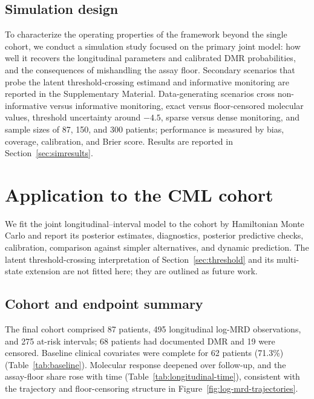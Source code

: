 \documentclass[11pt]{article}
\begin{document}
\subsection{Simulation design}
\label{sec:sim}

To characterize the operating properties of the framework beyond the
single cohort, we conduct a simulation study focused on the primary joint model: how well
it recovers the longitudinal parameters and calibrated DMR probabilities, and
the consequences of mishandling the assay floor. Secondary scenarios that
probe the latent threshold-crossing estimand and informative monitoring are
reported in the Supplementary Material. Data-generating
scenarios cross non-informative versus informative monitoring, exact
versus floor-censored molecular values, threshold uncertainty around
$-4.5$, sparse versus dense monitoring, and sample sizes of 87, 150, and
300 patients; performance is measured by bias, coverage, calibration, and
Brier score. Results are reported in Section~\ref{sec:simresults}.

\section{Application to the CML cohort}
\label{sec:application}

We fit the joint longitudinal--interval model to the cohort by Hamiltonian
Monte Carlo and report its posterior estimates, diagnostics, posterior
predictive checks, calibration, comparison against simpler alternatives, and
dynamic prediction. The latent threshold-crossing interpretation of
Section~\ref{sec:threshold} and its multi-state extension are not fitted
here; they are outlined as future work.

\subsection{Cohort and endpoint summary}

The final cohort comprised 87 patients, 495 longitudinal log-MRD
observations, and 275 at-risk intervals; 68 patients had documented DMR
and 19 were censored. Baseline clinical covariates were complete for 62
patients (71.3\%) (Table~\ref{tab:baseline}). Molecular response deepened
over follow-up, and the assay-floor share rose with time
(Table~\ref{tab:longitudinal-time}), consistent with the trajectory and
floor-censoring structure in Figure~\ref{fig:log-mrd-trajectories}.



\end{document}
